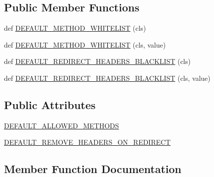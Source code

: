\subsection*{Public Member Functions}
\begin{DoxyCompactItemize}
\item 
def \hyperlink{classpip_1_1__vendor_1_1urllib3_1_1util_1_1retry_1_1__RetryMeta_acf48e0e6460595bcae6e922732056206}{D\+E\+F\+A\+U\+L\+T\+\_\+\+M\+E\+T\+H\+O\+D\+\_\+\+W\+H\+I\+T\+E\+L\+I\+ST} (cls)
\item 
def \hyperlink{classpip_1_1__vendor_1_1urllib3_1_1util_1_1retry_1_1__RetryMeta_abc344f3f09c94a61143d611b45441f51}{D\+E\+F\+A\+U\+L\+T\+\_\+\+M\+E\+T\+H\+O\+D\+\_\+\+W\+H\+I\+T\+E\+L\+I\+ST} (cls, value)
\item 
def \hyperlink{classpip_1_1__vendor_1_1urllib3_1_1util_1_1retry_1_1__RetryMeta_ab36a5e04b6a8a53b02f79782b483c228}{D\+E\+F\+A\+U\+L\+T\+\_\+\+R\+E\+D\+I\+R\+E\+C\+T\+\_\+\+H\+E\+A\+D\+E\+R\+S\+\_\+\+B\+L\+A\+C\+K\+L\+I\+ST} (cls)
\item 
def \hyperlink{classpip_1_1__vendor_1_1urllib3_1_1util_1_1retry_1_1__RetryMeta_a061d1d53b8b0c74b5860105f2116e42e}{D\+E\+F\+A\+U\+L\+T\+\_\+\+R\+E\+D\+I\+R\+E\+C\+T\+\_\+\+H\+E\+A\+D\+E\+R\+S\+\_\+\+B\+L\+A\+C\+K\+L\+I\+ST} (cls, value)
\end{DoxyCompactItemize}
\subsection*{Public Attributes}
\begin{DoxyCompactItemize}
\item 
\hyperlink{classpip_1_1__vendor_1_1urllib3_1_1util_1_1retry_1_1__RetryMeta_a4447b076d8b0c853cf8a456d0cebc0fd}{D\+E\+F\+A\+U\+L\+T\+\_\+\+A\+L\+L\+O\+W\+E\+D\+\_\+\+M\+E\+T\+H\+O\+DS}
\item 
\hyperlink{classpip_1_1__vendor_1_1urllib3_1_1util_1_1retry_1_1__RetryMeta_a30099c137eda67ceb1ad0e25b7dec4ab}{D\+E\+F\+A\+U\+L\+T\+\_\+\+R\+E\+M\+O\+V\+E\+\_\+\+H\+E\+A\+D\+E\+R\+S\+\_\+\+O\+N\+\_\+\+R\+E\+D\+I\+R\+E\+CT}
\end{DoxyCompactItemize}


\subsection{Member Function Documentation}
\mbox{\label{classpip_1_1__vendor_1_1urllib3_1_1util_1_1retry_1_1__RetryMeta_acf48e0e6460595bcae6e922732056206}} 
